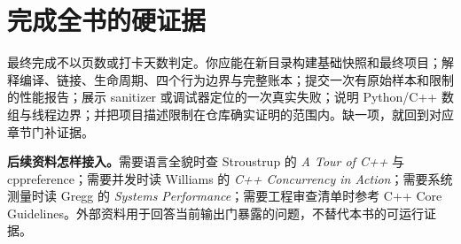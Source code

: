 \section{完成全书的硬证据}

最终完成不以页数或打卡天数判定。你应能在新目录构建基础快照和最终项目；解释编译、链接、生命周期、四个行为边界与完整账本；提交一次有原始样本和限制的性能报告；展示 sanitizer 或调试器定位的一次真实失败；说明 Python/C++ 数组与线程边界；并把项目描述限制在仓库确实证明的范围内。缺一项，就回到对应章节门补证据。

\noindent\textbf{后续资料怎样接入。}需要语言全貌时查 Stroustrup 的 \emph{A Tour of C++} 与 cppreference；需要并发时读 Williams 的 \emph{C++ Concurrency in Action}；需要系统测量时读 Gregg 的 \emph{Systems Performance}；需要工程审查清单时参考 C++ Core Guidelines。外部资料用于回答当前输出门暴露的问题，不替代本书的可运行证据。
